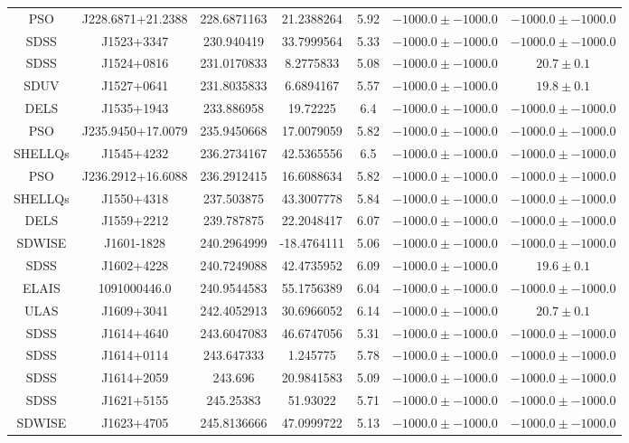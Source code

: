 \begin{table}
\begin{tabular}{ccccccc}
PSO & J228.6871+21.2388 & 228.6871163 & 21.2388264 & 5.92 & $-1000.0\pm-1000.0$ & $-1000.0\pm-1000.0$ \\
SDSS & J1523+3347 & 230.940419 & 33.7999564 & 5.33 & $-1000.0\pm-1000.0$ & $-1000.0\pm-1000.0$ \\
SDSS & J1524+0816 & 231.0170833 & 8.2775833 & 5.08 & $-1000.0\pm-1000.0$ & $  20.7\pm  0.1$ \\
SDUV & J1527+0641 & 231.8035833 & 6.6894167 & 5.57 & $-1000.0\pm-1000.0$ & $  19.8\pm  0.1$ \\
DELS & J1535+1943 & 233.886958 & 19.72225 & 6.4 & $-1000.0\pm-1000.0$ & $-1000.0\pm-1000.0$ \\
PSO & J235.9450+17.0079 & 235.9450668 & 17.0079059 & 5.82 & $-1000.0\pm-1000.0$ & $-1000.0\pm-1000.0$ \\
SHELLQs & J1545+4232 & 236.2734167 & 42.5365556 & 6.5 & $-1000.0\pm-1000.0$ & $-1000.0\pm-1000.0$ \\
PSO & J236.2912+16.6088 & 236.2912415 & 16.6088634 & 5.82 & $-1000.0\pm-1000.0$ & $-1000.0\pm-1000.0$ \\
SHELLQs & J1550+4318 & 237.503875 & 43.3007778 & 5.84 & $-1000.0\pm-1000.0$ & $-1000.0\pm-1000.0$ \\
DELS & J1559+2212 & 239.787875 & 22.2048417 & 6.07 & $-1000.0\pm-1000.0$ & $-1000.0\pm-1000.0$ \\
SDWISE & J1601-1828 & 240.2964999 & -18.4764111 & 5.06 & $-1000.0\pm-1000.0$ & $-1000.0\pm-1000.0$ \\
SDSS & J1602+4228 & 240.7249088 & 42.4735952 & 6.09 & $-1000.0\pm-1000.0$ & $  19.6\pm  0.1$ \\
ELAIS & 1091000446.0 & 240.9544583 & 55.1756389 & 6.04 & $-1000.0\pm-1000.0$ & $-1000.0\pm-1000.0$ \\
ULAS & J1609+3041 & 242.4052913 & 30.6966052 & 6.14 & $-1000.0\pm-1000.0$ & $  20.7\pm  0.1$ \\
SDSS & J1614+4640 & 243.6047083 & 46.6747056 & 5.31 & $-1000.0\pm-1000.0$ & $-1000.0\pm-1000.0$ \\
SDSS & J1614+0114 & 243.647333 & 1.245775 & 5.78 & $-1000.0\pm-1000.0$ & $-1000.0\pm-1000.0$ \\
SDSS & J1614+2059 & 243.696 & 20.9841583 & 5.09 & $-1000.0\pm-1000.0$ & $-1000.0\pm-1000.0$ \\
SDSS & J1621+5155 & 245.25383 & 51.93022 & 5.71 & $-1000.0\pm-1000.0$ & $-1000.0\pm-1000.0$ \\
SDWISE & J1623+4705 & 245.8136666 & 47.0999722 & 5.13 & $-1000.0\pm-1000.0$ & $-1000.0\pm-1000.0$ \\

\end{tabular}
\end{table}
